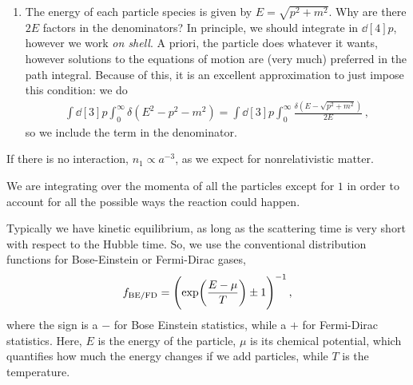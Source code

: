 \documentclass[main.tex]{subfiles}
\begin{document}
\begin{enumerate}
  \item The energy of each particle species is given by  \(E = \sqrt{p^2+m^2}\). 
  Why are there \(2E\) factors in the denominators? In principle, we should integrate in \(\dd[4]{p}\), however we work \emph{on shell}. A priori, the particle does whatever it wants, however solutions to the equations of motion are (very much) preferred in the path integral.
  Because of this, it is an excellent approximation to just impose this condition: we do 
  \begin{align}
  \int \dd[3]{p} \int_{0}^{ \infty } \delta (E^2- p^2-m^2) 
  = \int \dd[3]{p} \int_{0}^{ \infty } \frac{ \delta (E - \sqrt{p^2+m^2})}{2E}
  \,,
  \end{align}
  so we include the term in the denominator. 
\end{enumerate}


If there is no interaction, \(n_1 \propto a^{-3}\), as we expect for nonrelativistic matter. 

We are integrating over the momenta of all the particles except for \(1\) in order to account for all the possible ways the reaction could happen. 


Typically we have kinetic equilibrium, as long as the scattering time is very short with respect to the Hubble time. 
So, we use the conventional distribution functions for Bose-Einstein or Fermi-Dirac gases,
%
\begin{align}
f_{\text{BE/FD}} = \qty(\exp(\frac{E- \mu }{T}) \pm 1)^{-1}
\,,
\end{align}
%
where the sign is a \(-\) for Bose Einstein statistics, while a \(+\) for Fermi-Dirac statistics. 
Here, \(E\) is the energy of the particle, \(\mu \) is its chemical potential, which quantifies how much the energy changes if we add particles, while \(T\) is the temperature. 
\end{document}
